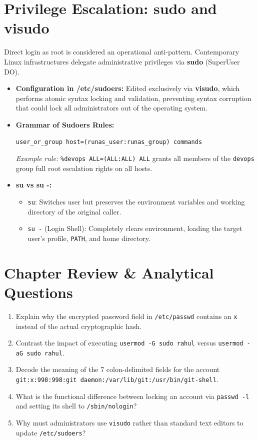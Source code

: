 \section{Privilege Escalation: sudo and visudo}
Direct login as root is considered an operational anti-pattern. Contemporary Linux infrastructures delegate administrative privileges via \textbf{sudo} (SuperUser DO).
\begin{itemize}[leftmargin=1.5em]
    \item \textbf{Configuration in /etc/sudoers:} Edited exclusively via \textbf{visudo}, which performs atomic syntax locking and validation, preventing syntax corruption that could lock all administrators out of the operating system.
    \item \textbf{Grammar of Sudoers Rules:}
    \begin{center}
    \texttt{user\_or\_group \quad host=(runas\_user:runas\_group) \quad commands}
    \end{center}
    \textit{Example rule:} \texttt{\%devops ALL=(ALL:ALL) ALL} grants all members of the \texttt{devops} group full root escalation rights on all hosts.
    \item \textbf{su vs su -:}
    \begin{itemize}
        \item \texttt{su}: Switches user but preserves the environment variables and working directory of the original caller.
        \item \texttt{su -} (Login Shell): Completely clears environment, loading the target user's profile, \texttt{PATH}, and home directory.
    \end{itemize}
\end{itemize}

\section{Chapter Review \& Analytical Questions}
\begin{enumerate}[leftmargin=1.5em]
    \item Explain why the encrypted password field in \texttt{/etc/passwd} contains an \texttt{x} instead of the actual cryptographic hash.
    \item Contrast the impact of executing \texttt{usermod -G sudo rahul} versus \texttt{usermod -aG sudo rahul}.
    \item Decode the meaning of the 7 colon-delimited fields for the account \texttt{git:x:998:998:git daemon:/var/lib/git:/usr/bin/git-shell}.
    \item What is the functional difference between locking an account via \texttt{passwd -l} and setting its shell to \texttt{/sbin/nologin}?
    \item Why must administrators use \texttt{visudo} rather than standard text editors to update \texttt{/etc/sudoers}?
\end{enumerate}

